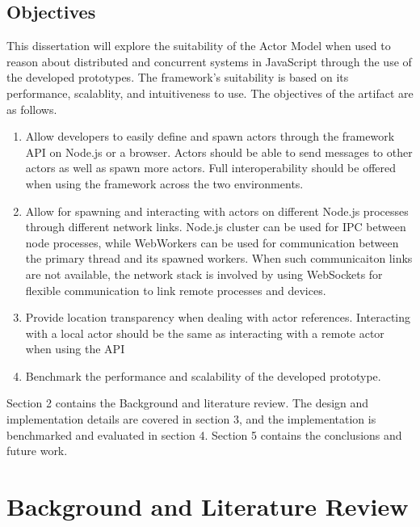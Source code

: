 \documentclass[12pt, a4paper]{report}
\theoremstyle{definition}
\theoremstyle{definition}%
\theoremstyle{definition}%
\theoremstyle{definition}%
\theoremstyle{definition}%
\theoremstyle{definition}%
\begin{document}
\section{Objectives}
This dissertation will explore the suitability of the Actor Model when used to reason about distributed and concurrent systems in JavaScript through the use of the developed prototypes. The framework's suitability is based on its performance, scalablity, and intuitiveness to use. The objectives of the artifact are as follows.
\begin{enumerate}
    \item Allow developers to easily define and spawn actors through the framework API on Node.js or a browser. Actors should be able to send messages to other actors as well as spawn more actors. Full interoperability should be offered when using the framework across the two environments.
    \item Allow for spawning and interacting with actors on different Node.js processes through different network links. Node.js cluster\cite{cluster} can be used for IPC between node processes, while WebWorkers\cite{webworkers} can be used for communication between the primary thread and its spawned workers. When such communicaiton links are not available, the network stack is involved by using WebSockets for flexible communication to link remote processes and devices.
    \item Provide location transparency when dealing with actor references. Interacting with a local actor should be the same as interacting with a remote actor when using the API
    \item Benchmark the performance and scalability of the developed prototype.
\end{enumerate}

Section 2 contains the Background and literature review. The design and implementation details are covered in section 3, and the implementation is benchmarked and evaluated in section 4. Section 5 contains the conclusions and future work.

\chapter{Background and Literature Review}
\end{document}
